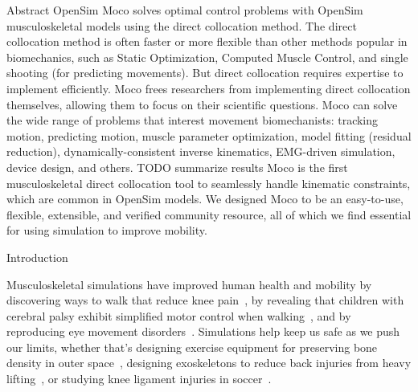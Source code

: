 \documentclass[10pt,letterpaper]{article}
\begin{document}
Abstract
OpenSim Moco solves optimal control problems with OpenSim musculoskeletal models using the direct collocation method.
The direct collocation method is often faster or more flexible than other methods popular in biomechanics, such as Static Optimization, Computed Muscle Control, and single shooting (for predicting movements). But direct collocation requires expertise to implement efficiently. Moco frees researchers from implementing direct collocation themselves, allowing them to focus on their scientific questions.
Moco can solve the wide range of problems that interest movement biomechanists: tracking motion, predicting motion, muscle parameter optimization, model fitting (residual reduction), dynamically-consistent inverse kinematics, EMG-driven simulation, device design, and others.
TODO summarize results
Moco is the first musculoskeletal direct collocation tool to seamlessly handle kinematic constraints, which are common in OpenSim models.
We designed Moco to be an easy-to-use, flexible, extensible, and verified community resource, all of which we find essential for using simulation to improve mobility.

Introduction

Musculoskeletal simulations have improved human health and mobility by discovering ways to walk that reduce knee pain~\cite{Fregly:2009}, by revealing that children with cerebral palsy exhibit simplified motor control when walking~\cite{Steele:2015}, and by reproducing eye movement disorders~\cite{Priamikov:2016}. Simulations help keep us safe as we push our limits, whether that’s designing exercise equipment for preserving bone density in outer space~\cite{Fregly:2015}, designing exoskeletons to reduce back injuries from heavy lifting~\cite{Manns:2016}, or studying knee ligament injuries in soccer~\cite{Thompson:2017}.
\end{document}
